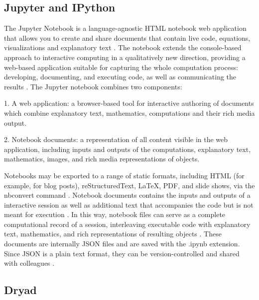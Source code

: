     \pv

\subsection{Jupyter and IPython}

    The Jupyter Notebook is a language-agnostic HTML notebook web
    application that allows you to create and share documents that
    contain live code, equations, visualizations and explanatory
    text \cite{www-jupyter-1}. The notebook extends the console-based
    approach to interactive computing in a qualitatively new
    direction, providing a web-based application suitable for
    capturing the whole computation process: developing, documenting,
    and executing code, as well as communicating the
    results \cite{www-jupyter-2}. The Jupyter notebook combines two
    components:
    
    1. A web application: a browser-based tool for interactive
    authoring of documents which combine explanatory text,
    mathematics, computations and their rich media output.

    2. Notebook documents: a representation of all content visible in
    the web application, including inputs and outputs of the
    computations, explanatory text, mathematics, images, and rich
    media representations of objects.

    Notebooks may be exported to a range of static formats, including
    HTML (for example, for blog posts), reStructuredText, LaTeX, PDF,
    and slide shows, via the nbconvert command \cite{www-jupyter-3}.
    Notebook documents contains the inputs and outputs of a
    interactive session as well as additional text that accompanies
    the code but is not meant for execution \cite{www-jupyter-4}. In
    this way, notebook files can serve as a complete computational
    record of a session, interleaving executable code with explanatory
    text, mathematics, and rich representations of resulting
    objects \cite{www-jupyter-5}. These documents are internally JSON
    files and are saved with the .ipynb extension. Since JSON is a
    plain text format, they can be version-controlled and shared with
    colleagues \cite{www-jupyter-6}.

\subsection{Dryad \vc}

